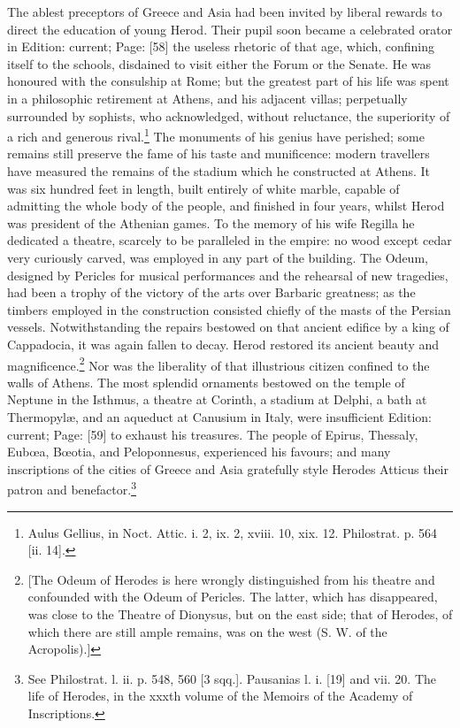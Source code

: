 The ablest preceptors of Greece and Asia had been invited by liberal rewards to direct the education of young Herod. Their pupil soon became a celebrated orator in Edition: current; Page: [58] the useless rhetoric of that age, which, confining itself to the schools, disdained to visit either the Forum or the Senate. He was honoured with the consulship at Rome; but the greatest part of his life was spent in a philosophic retirement at Athens, and his adjacent villas; perpetually surrounded by sophists, who acknowledged, without reluctance, the superiority of a rich and generous rival.\footnote{Aulus Gellius, in Noct. Attic. i. 2, ix. 2, xviii. 10, xix. 12. Philostrat. p. 564 [ii. 14].} The monuments of his genius have perished; some remains still preserve the fame of his taste and munificence: modern travellers have measured the remains of the stadium which he constructed at Athens. It was six hundred feet in length, built entirely of white marble, capable of admitting the whole body of the people, and finished in four years, whilst Herod was president of the Athenian games. To the memory of his wife Regilla he dedicated a theatre, scarcely to be paralleled in the empire: no wood except cedar very curiously carved, was employed in any part of the building. The Odeum, designed by Pericles for musical performances and the rehearsal of new tragedies, had been a trophy of the victory of the arts over Barbaric greatness; as the timbers employed in the construction consisted chiefly of the masts of the Persian vessels. Notwithstanding the repairs bestowed on that ancient edifice by a king of Cappadocia, it was again fallen to decay. Herod restored its ancient beauty and magnificence.\footnote{[The Odeum of Herodes is here wrongly distinguished from his theatre and confounded with the Odeum of Pericles. The latter, which has disappeared, was close to the Theatre of Dionysus, but on the east side; that of Herodes, of which there are still ample remains, was on the west (S. W. of the Acropolis).]} Nor was the liberality of that illustrious citizen confined to the walls of Athens. The most splendid ornaments bestowed on the temple of Neptune in the Isthmus, a theatre at Corinth, a stadium at Delphi, a bath at Thermopylæ, and an aqueduct at Canusium in Italy, were insufficient Edition: current; Page: [59] to exhaust his treasures. The people of Epirus, Thessaly, Eubœa, Bœotia, and Peloponnesus, experienced his favours; and many inscriptions of the cities of Greece and Asia gratefully style Herodes Atticus their patron and benefactor.\footnote{See Philostrat. l. ii. p. 548, 560 [3 sqq.]. Pausanias l. i. [19] and vii. 20. The life of Herodes, in the xxxth volume of the Memoirs of the Academy of Inscriptions.}


